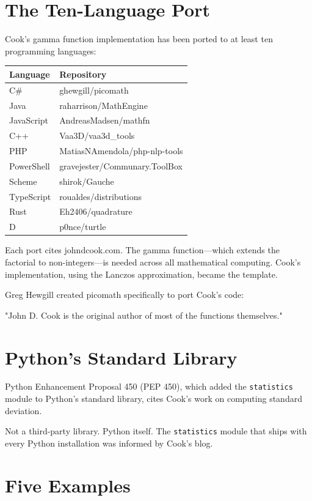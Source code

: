 \bigskip

\section*{The Ten-Language Port}

Cook's gamma function implementation has been ported to at least ten programming languages:

\begin{longtable}{l p{6.5cm}}
\toprule
\textbf{Language} & \textbf{Repository} \tabularnewline
\midrule
C\# & ghewgill/picomath \tabularnewline
Java & raharrison/MathEngine \tabularnewline
JavaScript & AndreasMadsen/mathfn \tabularnewline
C++ & Vaa3D/vaa3d\_tools \tabularnewline
PHP & MatiasNAmendola/php-nlp-tools \tabularnewline
PowerShell & gravejester/Communary.ToolBox \tabularnewline
Scheme & shirok/Gauche \tabularnewline
TypeScript & roualdes/distributions \tabularnewline
Rust & Eh2406/quadrature \tabularnewline
D & p0nce/turtle \tabularnewline
\bottomrule
\end{longtable}

Each port cites johndcook.com. The gamma function---which extends the factorial to non-integers---is needed across all mathematical computing. Cook's implementation, using the Lanczos approximation, became the template.

Greg Hewgill created picomath specifically to port Cook's code:

\begin{blogquote}
"John D. Cook is the original author of most of the functions themselves."
\end{blogquote}

\bigskip

\section*{Python's Standard Library}

Python Enhancement Proposal 450 (PEP 450), which added the \texttt{statistics} module to Python's standard library, cites Cook's work on computing standard deviation.

Not a third-party library. Python itself. The \texttt{statistics} module that ships with every Python installation was informed by Cook's blog.

\bigskip

\section*{Five Examples}

